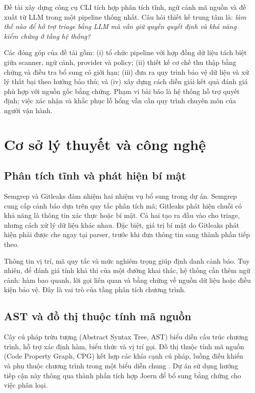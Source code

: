 \documentclass[11pt,a4paper]{article}
\begin{document}
Đề tài xây dựng công cụ CLI tích hợp phân tích tĩnh, ngữ cảnh mã nguồn và đề xuất từ LLM trong một pipeline thống nhất. Câu hỏi thiết kế trung tâm là: \textit{làm thế nào để hỗ trợ triage bằng LLM mà vẫn giữ quyền quyết định và khả năng kiểm chứng ở tầng hệ thống?}

Các đóng góp của đề tài gồm: (i) tổ chức pipeline với hợp đồng dữ liệu tách biệt giữa scanner, ngữ cảnh, provider và policy; (ii) thiết kế cơ chế thu thập bằng chứng và điều tra bổ sung có giới hạn; (iii) đưa ra quy trình bảo vệ dữ liệu và xử lý thất bại theo hướng bảo thủ; và (iv) xây dựng cách diễn giải kết quả đánh giá phù hợp với nguồn gốc bằng chứng. Phạm vi bài báo là hệ thống hỗ trợ quyết định; việc xác nhận và khắc phục lỗ hổng vẫn cần quy trình chuyên môn của người vận hành.

\section{Cơ sở lý thuyết và công nghệ}
\subsection{Phân tích tĩnh và phát hiện bí mật}
Semgrep và Gitleaks đảm nhiệm hai nhiệm vụ bổ sung trong dự án. Semgrep cung cấp cảnh báo dựa trên quy tắc phân tích mã; Gitleaks phát hiện chuỗi có khả năng là thông tin xác thực hoặc bí mật. Cả hai tạo ra đầu vào cho triage, nhưng cách xử lý dữ liệu khác nhau. Đặc biệt, giá trị bí mật do Gitleaks phát hiện phải được che ngay tại parser, trước khi đưa thông tin sang thành phần tiếp theo.

Thông tin vị trí, mã quy tắc và mức nghiêm trọng giúp định danh cảnh báo. Tuy nhiên, để đánh giá tính khả thi của một đường khai thác, hệ thống cần thêm ngữ cảnh: hàm bao quanh, lời gọi liên quan và bằng chứng về nguồn dữ liệu hoặc điều kiện bảo vệ. Đây là vai trò của tầng phân tích chương trình.

\subsection{AST và đồ thị thuộc tính mã nguồn}
Cây cú pháp trừu tượng (Abstract Syntax Tree, AST) biểu diễn cấu trúc chương trình, hỗ trợ xác định hàm, biểu thức và vị trí gọi. Đồ thị thuộc tính mã nguồn (Code Property Graph, CPG) kết hợp các khía cạnh cú pháp, luồng điều khiển và phụ thuộc chương trình trong một biểu diễn chung \citep{yamaguchi2014}. Dự án sử dụng hướng tiếp cận này thông qua thành phần tích hợp Joern để bổ sung bằng chứng cho việc phân loại.
\end{document}
